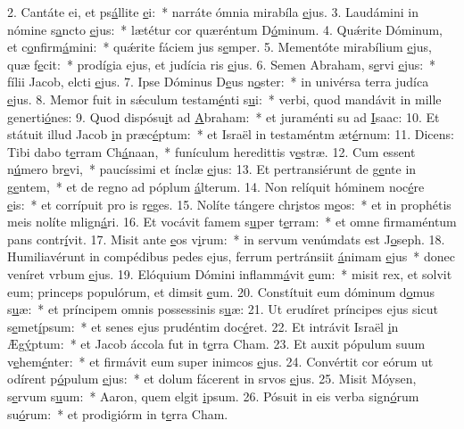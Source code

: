 2. Cantáte ei, et ps\uline{á}llite \uline{e}i:~* narráte ómnia mirabíla \uline{e}jus.
3. Laudámini in nómine s\uline{a}ncto \uline{e}jus:~* lætétur cor quæréntum D\uline{ó}minum.
4. Quǽrite Dóminum, et c\uline{o}nfirm\uline{á}mini:~* quǽrite fáciem jus s\uline{e}mper.
5. Mementóte mirabílium \uline{e}jus, quæ f\uline{e}cit:~* prodígia ejus, et judícia ris \uline{e}jus.
6. Semen Abraham, s\uline{e}rvi \uline{e}jus:~* fílii Jacob, elcti \uline{e}jus.
7. Ipse Dóminus D\uline{e}us n\uline{o}ster:~* in univérsa terra judíca \uline{e}jus.
8. Memor fuit in sǽculum testam\uline{é}nti s\uline{u}i:~* verbi, quod mandávit in mille generti\uline{ó}nes:
9. Quod dispósu\uline{i}t ad \uline{A}braham:~* et juraménti su ad \uline{I}saac:
10. Et státuit illud Jacob \uline{i}n præc\uline{é}ptum:~* et Israël in testaméntm æt\uline{é}rnum:
11. Dicens: Tibi dabo t\uline{e}rram Ch\uline{á}naan,~* funículum heredittis v\uline{e}stræ.
12. Cum essent n\uline{ú}mero br\uline{e}vi,~* paucíssimi et ínclæ \uline{e}jus:
13. Et pertransiérunt de g\uline{e}nte in g\uline{e}ntem,~* et de regno ad póplum \uline{á}lterum.
14. Non relíquit hóminem noc\uline{é}re \uline{e}is:~* et corrípuit pro is r\uline{e}ges.
15. Nolíte tángere chr\uline{i}stos m\uline{e}os:~* et in prophétis meis nolíte mlign\uline{á}ri.
16. Et vocávit famem s\uline{u}per t\uline{e}rram:~* et omne firmaméntum pans contr\uline{í}vit.
17. Misit ante \uline{e}os v\uline{i}rum:~* in servum venúmdats est J\uline{o}seph.
18. Humiliavérunt in compédibus pedes ejus, ferrum pertránsiit \uline{á}nimam \uline{e}jus~* donec veníret vrbum \uline{e}jus.
19. Elóquium Dómini inflamm\uline{á}vit \uline{e}um:~* misit rex, et solvit eum; princeps populórum, et dimsit \uline{e}um.
20. Constítuit eum dóminum d\uline{o}mus s\uline{u}æ:~* et príncipem omnis possessinis s\uline{u}æ:
21. Ut erudíret príncipes ejus sicut s\uline{e}met\uline{í}psum:~* et senes ejus prudéntim doc\uline{é}ret.
22. Et intrávit Israël \uline{i}n Æg\uline{ý}ptum:~* et Jacob áccola fut in t\uline{e}rra Cham.
23. Et auxit pópulum suum v\uline{e}hem\uline{é}nter:~* et firmávit eum super inimcos \uline{e}jus.
24. Convértit cor eórum ut odírent p\uline{ó}pulum \uline{e}jus:~* et dolum fácerent in srvos \uline{e}jus.
25. Misit Móysen, s\uline{e}rvum s\uline{u}um:~* Aaron, quem elgit \uline{i}psum.
26. Pósuit in eis verba sign\uline{ó}rum su\uline{ó}rum:~* et prodigiórm in t\uline{e}rra Cham.
